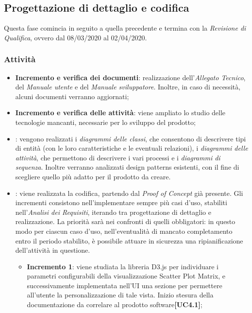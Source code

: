 \subsection{Progettazione di dettaglio e codifica}
Questa fase comincia in seguito a quella precedente e termina con la \textit{Revisione di Qualifica}, ovvero dal 08/03/2020 al 02/04/2020.

\subsubsection{Attività}
\begin{itemize}
	\item \textbf{Incremento e verifica dei documenti}: realizzazione dell'\textit{Allegato Tecnico}, del \textit{Manuale utente} e del \textit{Manuale sviluppatore}. Inoltre, in caso di necessità, alcuni documenti verranno aggiornati;
	\item \textbf{Incremento e verifica delle attività}: viene ampliato lo studio delle tecnologie mancanti, necessarie per lo sviluppo del prodotto; 
	\item \textbf{}: vengono realizzati i \textit{diagrammi delle classi}, che consentono di descrivere tipi di entità (con le loro caratteristiche e le eventuali relazioni), i \textit{diagrammi delle attività}, che permettono di descrivere i vari processi e i \textit{diagrammi di sequenza}. Inoltre verranno analizzati design patterns esistenti, con il fine di scegliere quello più adatto per il prodotto da creare.
	\item \textbf{}: viene realizzata la codifica, partendo dal \textit{Proof of Concept} già presente. Gli incrementi consistono nell'implementare sempre più casi d'uso, stabiliti nell'\textit{Analisi dei Requisiti}, iterando tra progettazione di dettaglio e realizzazione. La priorità sarà nei confronti di quelli obbligatori: in questo modo per ciascun caso d'uso, nell'eventualità di mancato completamento entro il periodo stabilito, è possibile attuare in sicurezza una ripianificazione dell'attività in questione.
	\begin{itemize}
	\item \textbf{Incremento 1}: viene studiata la libreria D3.js per individuare i parametri configurabili della visualizzazione Scatter Plot Matrix, e successivamente implementata nell'UI una sezione per permettere all'utente la personalizzazione di tale vista. Inizio stesura della documentazione da correlare al prodotto software\textbf{[UC4.1]};
	

\end{itemize}
\end{itemize}
